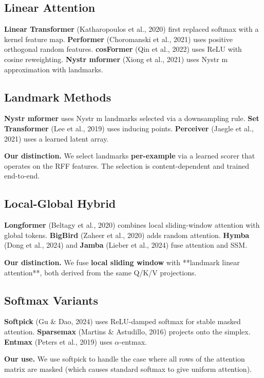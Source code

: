 \subsection{Linear Attention}

\textbf{Linear Transformer} (Katharopoulos et al., 2020) first replaced softmax 
with a kernel feature map. \textbf{Performer} (Choromanski et al., 2021) uses 
positive orthogonal random features. \textbf{cosFormer} (Qin et al., 2022) uses 
ReLU with cosine reweighting. \textbf{Nystr mformer} (Xiong et al., 2021) uses 
Nystr m approximation with landmarks.

\subsection{Landmark Methods}

\textbf{Nystr mformer} uses Nystr m landmarks selected via a downsampling rule. 
\textbf{Set Transformer} (Lee et al., 2019) uses inducing points. \textbf{Perceiver} 
(Jaegle et al., 2021) uses a learned latent array.

\textbf{Our distinction.} We select landmarks \textbf{per-example} via a learned 
scorer that operates on the RFF features. The selection is content-dependent 
and trained end-to-end.

\subsection{Local-Global Hybrid}

\textbf{Longformer} (Beltagy et al., 2020) combines local sliding-window 
attention with global tokens. \textbf{BigBird} (Zaheer et al., 2020) adds 
random attention. \textbf{Hymba} (Dong et al., 2024) and \textbf{Jamba} (Lieber 
et al., 2024) fuse attention and SSM.

\textbf{Our distinction.} We fuse \textbf{local sliding window} with **landmark 
linear attention**, both derived from the same Q/K/V projections.

\subsection{Softmax Variants}

\textbf{Softpick} (Gu \& Dao, 2024) uses ReLU-damped softmax for stable 
masked attention. \textbf{Sparsemax} (Martins \& Astudillo, 2016) projects 
onto the simplex. \textbf{Entmax} (Peters et al., 2019) uses $\alpha$-entmax.

\textbf{Our use.} We use softpick to handle the case where all rows of the 
attention matrix are masked (which causes standard softmax to give 
uniform attention).

